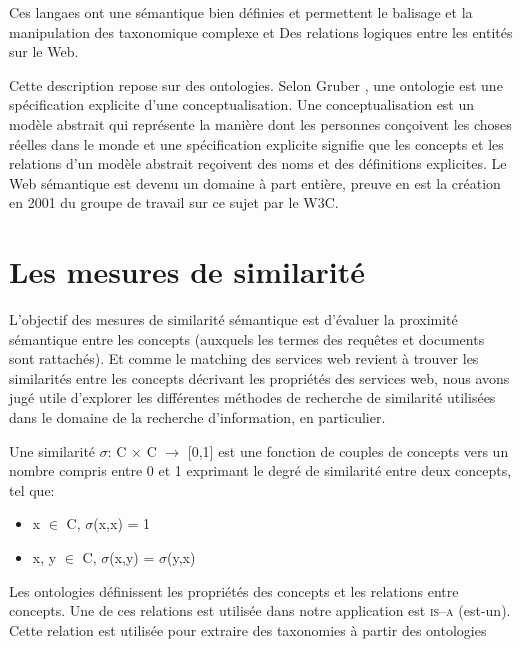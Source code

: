 \begin{appendices}
Ces langaes ont une sémantique bien définies et permettent le balisage
et la manipulation des taxonomique complexe et Des relations logiques
entre les entités sur le Web. \cite{fensel2000creating}

% 

Cette description repose sur des ontologies. Selon Gruber
\cite{gruber1993translation}, une ontologie est une spécification
explicite d'une conceptualisation. Une conceptualisation est un modèle
abstrait qui représente la manière dont les personnes conçoivent les
choses réelles dans le monde et une spécification explicite signifie
que les concepts et les relations d'un modèle abstrait reçoivent des
noms et des définitions explicites. Le Web sémantique est devenu un
domaine à part entière, preuve en est la création en 2001 du groupe de
travail sur ce sujet par le \textsc{W3C}.

\chapter{Les mesures de similarité}
\label{annexe:similarity-measurement}

L'objectif des mesures de similarité sémantique est d'évaluer la
proximité sémantique entre les concepts (auxquels les termes des
requêtes et documents sont rattachés). Et comme le matching des
services web revient à trouver les similarités entre les concepts
décrivant les propriétés des services web, nous avons jugé utile
d'explorer les différentes méthodes de recherche de similarité
utilisées dans le domaine de la recherche d’information, en
particulier.

\begin{mydef}
  Une similarité $\sigma$: C $\times$ C $\rightarrow$ [0,1] est une
  fonction de couples de concepts vers un nombre compris entre 0 et 1
  exprimant le degré de similarité entre deux concepts, tel que:
  \SpecialItem
  \begin{itemize}
  \item x $\in$ C, $\sigma$(x,x) = 1
  \item x, y $\in$ C, $\sigma$(x,y) = $\sigma$(y,x)
  \end{itemize}
\end{mydef}

Les ontologies définissent les propriétés des concepts et les
relations entre concepts. Une de ces relations est utilisée dans notre
application est \textsc{is–a} (est-un). Cette relation est utilisée
pour extraire des taxonomies à partir des ontologies


\end{appendices}
